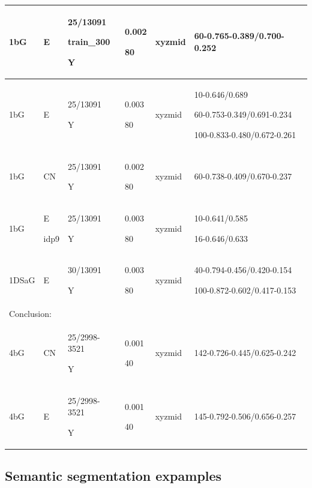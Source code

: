 \documentclass[,table,dvipsnames]{article}
\begin{document}
\begin{center}
\begin{tabular}{|p{1cm} |p{1cm} |p{1.5cm} | p{2cm} | p{2cm} || p{5cm}|}
		
		\hline\hline
		1bG & E & 25/13091\par train\_300\par Y & 0.002\par 80 & xyzmid & 60-0.765-0.389/0.700-0.252\\ \hline
		1bG & E & 25/13091\par Y & 0.003\par 80 & xyzmid & 10-0.646/0.689 \par 60-0.753-0.349/0.691-0.234 \par  100-0.833-0.480/0.672-0.261\\ \hline
		1bG & CN & 25/13091\par Y & 0.002\par 80 & xyzmid & 60-0.738-0.409/0.670-0.237\\ \hline
		1bG & E \par idp9 & 25/13091\par Y & 0.003\par 80 & xyzmid & 10-0.641/0.585 \par 16-0.646/0.633\\ \hline
		1DSaG & E & 30/13091\par Y & 0.003\par 80 & xyzmid & 40-0.794-0.456/0.420-0.154 \par 100-0.872-0.602/0.417-0.153\\ \hline
		
		\multicolumn{6}{|p{12.5cm}|}{ Conclusion:\par		 }  \\
		
		\hline\hline
		4bG & CN & 25/2998-3521\par Y & 0.001\par 40 & xyzmid & 142-0.726-0.445/0.625-0.242\\
		\hline
		4bG & E & 25/2998-3521\par Y & 0.001\par 40 & xyzmid & 145-0.792-0.506/0.656-0.257\\
		\hline
	\end{tabular}
\end{center}


\subsection{Semantic segmentation expamples}
\end{document}
